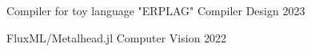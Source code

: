 

\begin{cvhonors}
    \cvhonor
        {Compiler for toy language "ERPLAG"} %
        {\href{https://github.com/theabhirath/erplag-compiler}{\color{red}{GitHub repository}}} %
        {Compiler Design} %
        {2023} %

    \cvhonor
        {FluxML/Metalhead.jl} %
        {\href{https://github.com/FluxML/Metalhead.jl}{\color{red}{GitHub repository}}} %
        {Computer Vision} %
        {2022} %

\end{cvhonors}